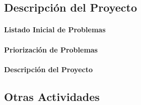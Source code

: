 \documentclass{article}
\begin{document}
\subsection{Descripción del Proyecto}
\paragraph{Listado Inicial de Problemas}
\paragraph{Priorización de Problemas}
\paragraph{Descripción del Proyecto}
\subsection{Otras Actividades}
\paragraph{}
\end{document}
